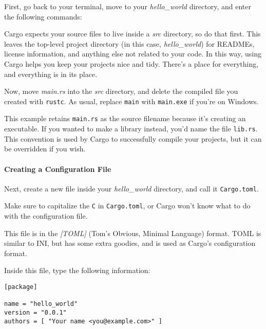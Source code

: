 \documentclass[a4paper,]{book}
\newenvironment{Shaded}{\begin{snugshade}}{\end{snugshade}}
\newcommand{\KeywordTok}[1]{\textcolor[rgb]{0.13,0.29,0.53}{\textbf{{#1}}}}
\newcommand{\CommentTok}[1]{\textcolor[rgb]{0.56,0.35,0.01}{\textit{{#1}}}}
\newcommand{\NormalTok}[1]{{#1}}
\let\oldparagraph\paragraph
\renewcommand{\paragraph}[1]{\oldparagraph{#1}\mbox{}}
\begin{document}
First, go back to your terminal, move to your \emph{hello\_world}
directory, and enter the following commands:

\begin{Shaded}
\end{Shaded}

Cargo expects your source files to live inside a \emph{src} directory,
so do that first. This leaves the top-level project directory (in this
case, \emph{hello\_world}) for READMEs, license information, and
anything else not related to your code. In this way, using Cargo helps
you keep your projects nice and tidy. There's a place for everything,
and everything is in its place.

Now, move \emph{main.rs} into the \emph{src} directory, and delete the
compiled file you created with \texttt{rustc}. As usual, replace
\texttt{main} with \texttt{main.exe} if you're on Windows.

This example retains \texttt{main.rs} as the source filename because
it's creating an executable. If you wanted to make a library instead,
you'd name the file \texttt{lib.rs}. This convention is used by Cargo to
successfully compile your projects, but it can be overridden if you
wish.

\paragraph{Creating a Configuration
File}\label{creating-a-configuration-file}

Next, create a new file inside your \emph{hello\_world} directory, and
call it \texttt{Cargo.toml}.

Make sure to capitalize the \texttt{C} in \texttt{Cargo.toml}, or Cargo
won't know what to do with the configuration file.

This file is in the \emph{{[}TOML{]}} (Tom's Obvious, Minimal Language)
format. TOML is similar to INI, but has some extra goodies, and is used
as Cargo's configuration format.

Inside this file, type the following information:

\begin{verbatim}
[package]

name = "hello_world"
version = "0.0.1"
authors = [ "Your name <you@example.com>" ]
\end{verbatim}
\end{document}
